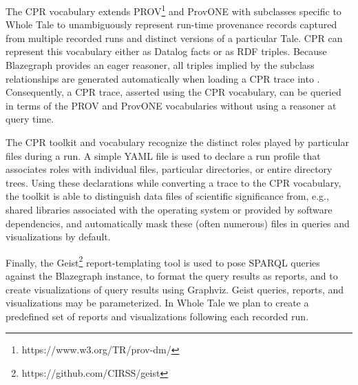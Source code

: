 The CPR vocabulary extends PROV\footnote{https://www.w3.org/TR/prov-dm/} and ProvONE \cite{provone_2015} with subclasses specific to Whole Tale to unambiguously represent run-time provenance records captured from multiple recorded runs and distinct versions of a particular Tale. CPR can represent this vocabulary either as Datalog facts or as RDF triples. Because Blazegraph provides an eager reasoner, all triples implied by the subclass relationships are generated automatically when loading a CPR trace into . Consequently, a CPR trace, asserted using the CPR vocabulary, can be queried in terms of the PROV and ProvONE vocabularies without using a reasoner at query time.

The CPR toolkit and vocabulary recognize the distinct roles played by particular files during a run. A simple YAML file is used to declare a run profile that associates roles with individual files, particular directories, or entire directory trees. Using these declarations while converting a  trace to the CPR vocabulary, the toolkit is able to distinguish data files of scientific significance from, e.g., shared libraries associated with the operating system or provided by software dependencies, and automatically mask these (often numerous) files in queries and visualizations by default.

Finally, the Geist\footnote{https://github.com/CIRSS/geist} report-templating tool is used to pose SPARQL queries against the Blazegraph instance, to format the query results as reports, and to create visualizations of query results using Graphviz.  Geist queries, reports, and visualizations may be parameterized. In Whole Tale we plan to create a predefined set of reports and visualizations following each recorded run.
